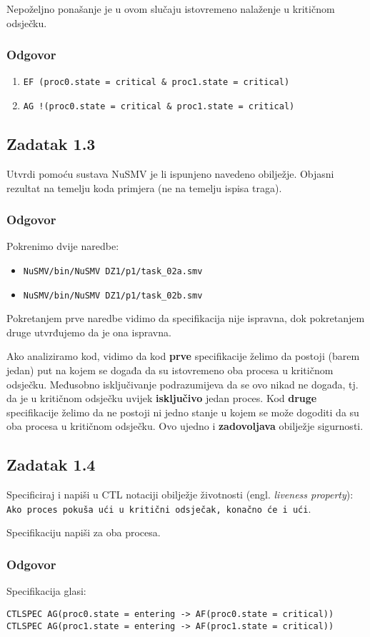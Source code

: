 \documentclass{article}
\newcommand{\code}[1]{\colorbox{blue!15}{\texttt{#1}}}
\newcommand{\odgovor}{\subsubsection*{Odgovor}}
\newcommand{\zadatak}[1]{\subsection{Zadatak #1}}
\begin{document}
\noindent
Nepoželjno ponašanje je u ovom slučaju istovremeno nalaženje u kritičnom odsječku.

\odgovor

\begin{enumerate}[label=\alph*)]
\item \code{EF (proc0.state = critical \& proc1.state = critical)}
\item \code{AG !(proc0.state = critical \& proc1.state = critical)}
\end{enumerate}


\zadatak{1.3}

Utvrdi pomoću sustava NuSMV je li ispunjeno navedeno obilježje. Objasni rezultat na temelju koda primjera (ne na temelju ispisa traga).

\odgovor

Pokrenimo dvije naredbe:

\begin{itemize}
\item \code{NuSMV/bin/NuSMV DZ1/p1/task\_02a.smv}
\item \code{NuSMV/bin/NuSMV DZ1/p1/task\_02b.smv}
\end{itemize}

\noindent
Pokretanjem prve naredbe vidimo da specifikacija nije ispravna, dok pokretanjem druge utvrđujemo da je ona ispravna.
\newline

Ako analiziramo kod, vidimo da kod \textbf{prve} specifikacije želimo da postoji (barem jedan) put na kojem se događa da su istovremeno oba procesa u kritičnom odsječku. Međusobno isključivanje podrazumijeva da se ovo nikad ne događa, tj. da je u kritičnom odsječku uvijek \textbf{isključivo} jedan proces. Kod \textbf{druge} specifikacije želimo da ne postoji ni jedno stanje u kojem se može dogoditi da su oba procesa u kritičnom odsječku. Ovo ujedno i \textbf{zadovoljava} obilježje sigurnosti.
\pagebreak  %


\zadatak{1.4}

Specificiraj i napiši u CTL notaciji obilježje životnosti (engl. \textit{liveness property}):\newline
\code{Ako proces pokuša ući u kritični odsječak, konačno će i ući}.
\newline

\noindent
Specifikaciju napiši za oba procesa. 

\odgovor

Specifikacija glasi:

\begin{verbatim}
CTLSPEC AG(proc0.state = entering -> AF(proc0.state = critical))
CTLSPEC AG(proc1.state = entering -> AF(proc1.state = critical))
\end{verbatim}
\end{document}
